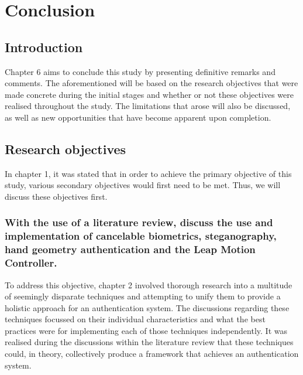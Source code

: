 \chapter{Conclusion}


\section{Introduction}

Chapter 6 aims to conclude this study by presenting definitive remarks and comments. The aforementioned will be based on the research objectives that were made concrete during the initial stages and whether or not these objectives were realised throughout the study. The limitations that arose will also be discussed, as well as new opportunities that have become apparent upon completion.

\section{Research objectives}

In chapter 1, it was stated that in order to achieve the primary objective of this study, various secondary objectives would first need to be met. Thus, we will discuss these objectives first.

\subsection{With the use of a literature review, discuss the use and implementation of cancelable biometrics, steganography, hand geometry authentication and the Leap Motion Controller.}

To address this objective, chapter 2 involved thorough research into a multitude of seemingly disparate techniques and attempting to unify them to provide a holistic approach for an authentication system. The discussions regarding these techniques focussed on their individual characteristics and what the best practices were for implementing each of those techniques independently. It was realised during the discussions within the literature review that these techniques could, in theory, collectively produce a framework that achieves an authentication system.

